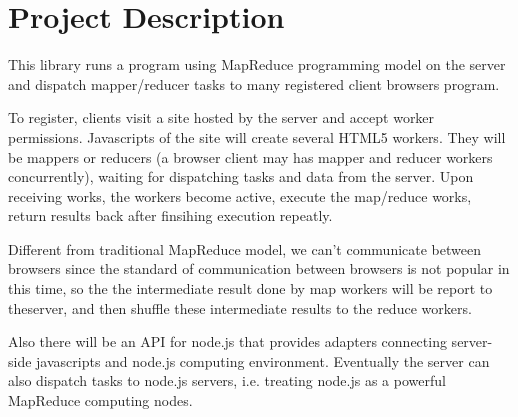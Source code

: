 \section{Project Description}
\label{ch3}

This library runs a program using MapReduce programming model on the server and dispatch mapper/reducer tasks to many registered client browsers program.

To register, clients visit a site hosted by the server and accept worker permissions. Javascripts of the site will create several HTML5 workers. They will be mappers or reducers (a browser client may has mapper and reducer workers concurrently), waiting for dispatching tasks and data from the server. Upon receiving works, the workers become active, execute the map/reduce works, return results back after finsihing execution repeatly.

Different from traditional MapReduce model, we can’t communicate between browsers since the standard of communication between browsers is not popular in this time, so the the intermediate result done by map workers will be report to theserver, and then shuffle these intermediate results to the reduce workers.

Also there will be an API for node.js that provides adapters connecting server-side javascripts and node.js computing environment. Eventually the server can also dispatch tasks to node.js servers, i.e. treating node.js as a powerful MapReduce computing nodes.